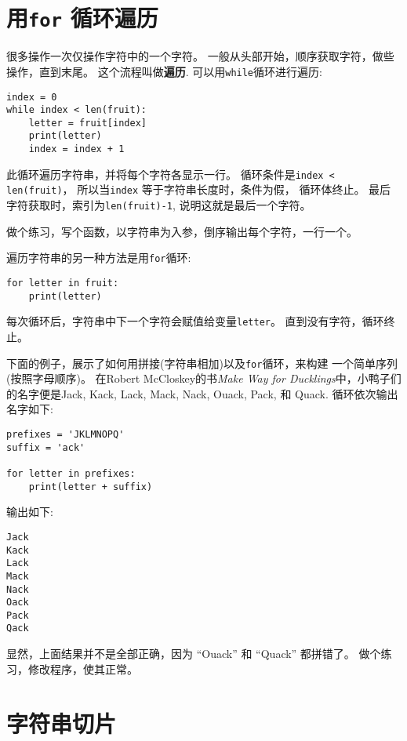 \documentclass[10pt]{book}
\begin{document}
\section{用{\tt for} 循环遍历}
\label{for}
很多操作一次仅操作字符中的一个字符。
一般从头部开始，顺序获取字符，做些操作，直到末尾。
这个流程叫做{\bf 遍历}.
可以用{\tt while}循环进行遍历:

\begin{verbatim}
index = 0
while index < len(fruit):
    letter = fruit[index]
    print(letter)
    index = index + 1
\end{verbatim}
%
此循环遍历字符串，并将每个字符各显示一行。
循环条件是{\tt index < len(fruit)}，
所以当{\tt index} 等于字符串长度时，条件为假， 循环体终止。
最后字符获取时，索引为{\tt len(fruit)-1}, 说明这就是最后一个字符。

做个练习，写个函数，以字符串为入参，倒序输出每个字符，一行一个。

遍历字符串的另一种方法是用{\tt for}循环:

\begin{verbatim}
for letter in fruit:
    print(letter)
\end{verbatim}
%
每次循环后，字符串中下一个字符会赋值给变量{\tt letter}。
直到没有字符，循环终止。

下面的例子，展示了如何用拼接(字符串相加)以及{\tt for}循环，来构建
一个简单序列(按照字母顺序)。
在Robert McCloskey的书{\em Make
Way for Ducklings}中，小鸭子们的名字便是Jack, Kack, Lack,
Mack, Nack, Ouack, Pack, 和 Quack.
循环依次输出名字如下:

\begin{verbatim}
prefixes = 'JKLMNOPQ'
suffix = 'ack'

for letter in prefixes:
    print(letter + suffix)
\end{verbatim}
%
输出如下:

\begin{verbatim}
Jack
Kack
Lack
Mack
Nack
Oack
Pack
Qack
\end{verbatim}
%
显然，上面结果并不是全部正确，因为 ``Ouack'' 和 ``Quack'' 都拼错了。
做个练习，修改程序，使其正常。



\section{字符串切片}
\label{slice}
  
 
\end{document}
